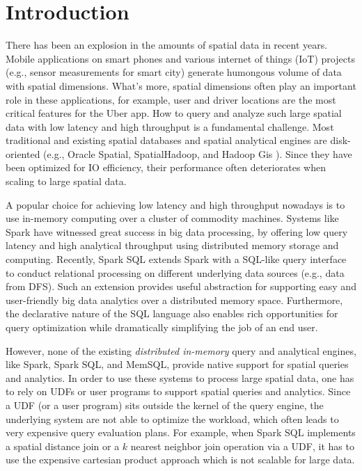 \section{Introduction}
\label{sec:intro}
There has been an explosion in the amounts of spatial data in recent
years. Mobile applications on smart phones and various internet of
things (IoT) projects (e.g., sensor measurements for smart city)
generate humongous volume of data with spatial dimensions. What's
more, spatial dimensions often play an important role in these
applications, for example, user and driver locations are the most
critical features for the Uber app. How to query and analyze such large
spatial data with low latency and high throughput is a fundamental
challenge. Most traditional and existing spatial databases and spatial
analytical engines are disk-oriented (e.g., Oracle Spatial,
SpatialHadoop, and Hadoop Gis \cite{spatialhadoop,hadoopgis}). Since
they have been optimized for IO efficiency, their performance often
deteriorates when scaling to large spatial data.

A popular choice for achieving low latency and high throughput
nowadays is to use in-memory computing over a cluster of commodity
machines. Systems like Spark \cite{spark} have witnessed great success
in big data processing, by offering low query latency and high
analytical throughput using distributed memory storage and
computing. Recently, Spark SQL \cite{sparksql} extends Spark with a
SQL-like query interface to conduct relational processing on different
underlying data sources (e.g., data from DFS). Such an extension
provides useful abstraction for supporting easy and user-friendly big
data analytics over a distributed memory space. Furthermore, the
declarative nature of the SQL language also enables rich opportunities
for query optimization while dramatically simplifying the job of an
end user.

However, none of the existing {\em distributed in-memory} query and
analytical engines, like Spark, Spark SQL, and MemSQL, provide native
support for spatial queries and analytics. In order to use these
systems to process large spatial data, one has to rely on UDFs or user
programs to support spatial queries and analytics. Since a UDF (or a
user program) sits outside the kernel of the query engine, the
underlying system are not able to optimize the workload, which often
leads to very expensive query evaluation plans. For example, when
Spark SQL implements a spatial distance join or a $k$ nearest neighbor
join operation via a UDF, it has to use the expensive cartesian
product approach which is not scalable for large data.

